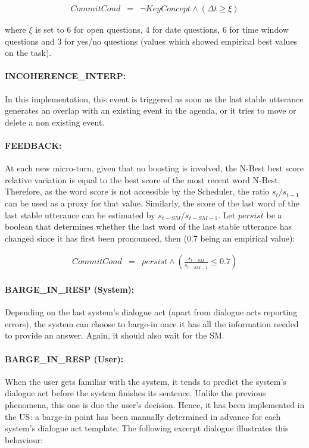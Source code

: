 			\begin{eqnarray}
				CommitCond & = & \neg KeyConcept \wedge (\Delta t \geq \xi) \nonumber
			\end{eqnarray}
			
			where $\xi$ is set to 6 for open questions, 4 for date questions, 6 for time window questions and 3 for yes/no questions (values which showed empirical best values on the task).
         
         \paragraph{INCOHERENCE\_INTERP:} In this implementation, this event is triggered as soon as the last stable utterance generates an overlap with an existing event in the agenda, or it tries to move or delete a non existing event.
         
         \paragraph{FEEDBACK:} At each new micro-turn, given that no boosting is involved, the N-Best best score relative variation is equal to the best score of the most recent word N-Best. Therefore, as the word score is not accessible by the Scheduler, the ratio $s_t/s_{t-1}$ can be used as a proxy for that value. Similarly, the score of the last word of the last stable utterance can be estimated by $s_{t-SM}/s_{t-SM-1}$. Let $persist$ be a boolean that determines whether the last word of the last stable utterance has changed since it has first been pronounced, then (0.7 being an empirical value):
				
					\begin{eqnarray}
						CommitCond & = & persist \wedge (\frac{s_{t-SM}}{s_{t-SM-1}} \leq 0.7) \nonumber
					\end{eqnarray}
         
         \paragraph{BARGE\_IN\_RESP (System):} Depending on the last system's dialogue act (apart from dialogue acts reporting errors), the system can choose to barge-in once it has all the information needed to provide an answer. Again, it should also wait for the SM.
         
         \paragraph{BARGE\_IN\_RESP (User):} When the user gets familiar with the system, it tends to predict the system's dialogue act before the system finishes its sentence. Unlike the previous phenomena, this one is due the user's decision. Hence, it has been implemented in the US: a barge-in point has been manually determined in advance for each system's dialogue act template. The following excerpt dialogue illustrates this behaviour:

